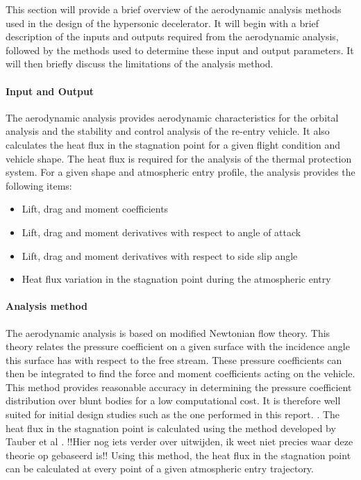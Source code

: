 This section will provide a brief overview of the aerodynamic analysis methods used in the design of the hypersonic decelerator. It will begin with a brief description of the inputs and outputs required from the aerodynamic analysis, followed by the methods used to determine these input and output parameters. It will then briefly discuss the limitations of the analysis method. 

\paragraph{Input and Output}
The aerodynamic analysis provides aerodynamic characteristics for the orbital analysis and the stability and control analysis of the re-entry vehicle. It also calculates the heat flux in the stagnation point for a given flight condition and vehicle shape. The heat flux is required for the analysis of the thermal protection system. For a given shape and atmospheric entry profile, the analysis provides the following items:

\begin{itemize}
	\item{Lift, drag and moment coefficients}
	\item{Lift, drag and moment derivatives with respect to angle of attack}
	\item{Lift, drag and moment derivatives with respect to side slip angle}
	\item{Heat flux variation in the stagnation point during the atmospheric entry }
\end{itemize}

\paragraph{Analysis method}
The aerodynamic analysis is based on modified Newtonian flow theory. This theory relates the pressure coefficient on a given surface with the incidence angle this surface has with respect to the free stream. These pressure coefficients can then be integrated to find the force and moment coefficients acting on the vehicle. This method provides reasonable accuracy in determining the pressure coefficient distribution over blunt bodies for a low computational cost. It is therefore well suited for initial design studies such as the one performed in this report. \cite{AndersonJr.2006}. 
The heat flux in the stagnation point is calculated using the method developed by Tauber et al \cite{Tauber1986}. !!Hier nog iets verder over uitwijden, ik weet niet precies waar deze theorie op gebaseerd is!!
Using this method, the heat flux in the stagnation point can be calculated at every point of a given atmospheric entry trajectory.

